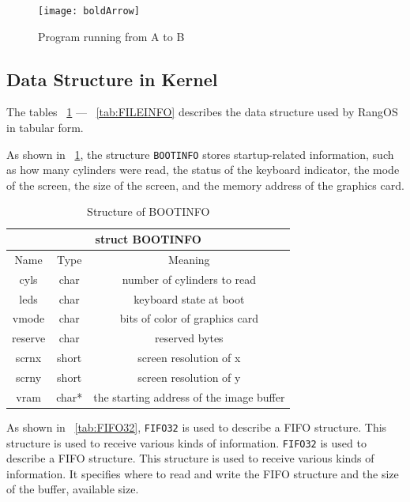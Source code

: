 \documentclass{swfcthesis}
\begin{document}
\begin{figure}[!htbp]
  \centering
  \texttt{[image: boldArrow]}
  \caption{Program running from A to B}
  \label{fig:boldArrow}
\end{figure}

\subsection{Data Structure in Kernel}
\label{sec:datastructure-kernel}

The tables ~\ref{tab:BOOTINFO} — ~\ref{tab:FILEINFO} describes the data structure used by
RangOS in tabular form.

As shown in ~\ref{tab:BOOTINFO}, the structure \texttt{BOOTINFO} stores startup-related information, such as how many cylinders were
read, the status of the keyboard indicator, the mode of the screen, the size of the
screen, and the memory address of the graphics card.
\begin{table}[h!]
  \centering
  \begin{tabular}[c]{|c|c|c|}
    \hline
    \multicolumn{3}{|c|}{struct BOOTINFO} \\
    \hline
    Name & Type & Meaning \\ \hline
    cyls & char & number of cylinders to read \\
    \hline
    leds & char & keyboard state at boot \\
    \hline
    vmode & char & bits of color of graphics card \\
    \hline
    reserve & char & reserved bytes \\
    \hline
    scrnx & short & screen resolution of x\\
    \hline
    scrny & short & screen resolution of y\\
    \hline
    vram & char* & the starting address of the image buffer \\
    \hline
  \end{tabular}
  \caption{Structure of BOOTINFO}
  \label{tab:BOOTINFO}
\end{table}

As shown in ~\ref{tab:FIFO32}, \texttt{FIFO32} is used to describe a FIFO structure. This
structure is used to receive various kinds of information. \texttt{FIFO32} is used to
describe a FIFO structure. This structure is used to receive various kinds of
information. It specifies where to read and write the FIFO structure and the size of the
buffer, available size.
\end{document}
